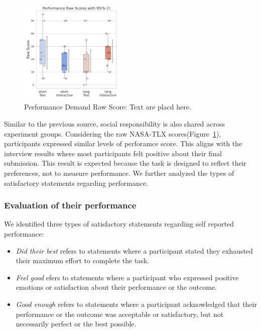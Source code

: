 \begin{figure} %
    \centering
    \includegraphics[width=0.45\textwidth, trim=0 13 0 13, clip]{content/image/cog/Performance_scores.pdf}
    \captionsetup{width=0.40\textwidth, justification=justified} %
    \caption{Performance Demand Raw Score: Text are placd here.}
    \label{fig:performance_cog_score}
\end{figure}

Similar to the previous source, social responsibility is also shared across experiment groups. Considering the raw NASA-TLX scores(Figure~\ref{fig:performance_cog_score}), participants expressed similar levels of perforamce score. This aligns with the interview results where most participants felt positive about their final submission. This result is expected because the task is designed to reflect their preferences, not to measure performance. We further analyzed the types of satisfactory statements regarding performance.

\subsubsection{Evaluation of their performance}
We identified three types of satisfactory statements regarding self reported performance:
\begin{itemize}
    \item \textit{Did their best} refers to statements where a participant stated they exhausted their maximum effort to complete the task.
    \item \textit{Feel good} efers to statements where a participant who expressed positive emotions or satisfaction about their performance or the outcome.
    \item \textit{Good enough} refers to statements where a participant acknowledged that their performance or the outcome was acceptable or satisfactory, but not necessarily perfect or the best possible.
\end{itemize}

